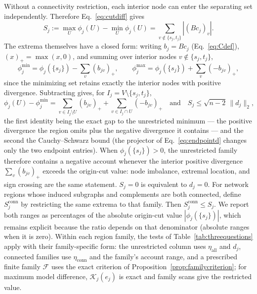 \documentclass[a4paper,fleqn]{cas-sc}
\newcommand{\norm}[1]{\lVert #1 \rVert}
\begin{document}
Without a connectivity restriction, each interior node can enter the
separating set independently. Therefore Eq.~\eqref{eq:cutdiff} gives
\begin{equation}
S_j:=\max_U\phi_j(U)-\min_U\phi_j(U)
=\sum_{v\notin\{s_j,t_j\}}|(Bc_j)_v|.
\label{eq:cutspread}
\end{equation}
The extrema themselves have a closed form: writing $b_j=Bc_j$
(Eq.~\eqref{eq:Cdef}), $(x)_+=\max(x,0)$, and summing over interior nodes
$v\notin\{s_j,t_j\}$,
\begin{equation}
\phi_j^{\min}=\phi_j(\{s_j\})-\sum_v(b_{jv})_+,
\qquad
\phi_j^{\max}=\phi_j(\{s_j\})+\sum_v(-b_{jv})_+,
\label{eq:cutextrema}
\end{equation}
since the minimizing set retains exactly the interior nodes with
positive divergence. Subtracting gives, for $I_j=V\setminus\{s_j,t_j\}$,
\begin{equation}
\phi_j(U)-\phi_j^{\min}
=\sum_{v\in I_j\setminus U}(b_{jv})_+
+\sum_{v\in I_j\cap U}(-b_{jv})_+
\quad\text{and}\quad
S_j\le\sqrt{n-2}\,\norm{d_j}_2,
\label{eq:cutgap}
\end{equation}
the first identity being the exact gap to the unrestricted minimum ---
the positive divergence the region omits plus the negative divergence
it contains --- and the second the Cauchy--Schwarz bound (the
projector of Eq.~\eqref{eq:endpointd} changes only the two endpoint
entries). When
$\phi_j(\{s_j\})>0$, the unrestricted family
therefore contains a negative account whenever the interior positive
divergence $\sum_v(b_{jv})_+$ exceeds the origin-cut value: node
imbalance, extremal location, and sign crossing are the same statement.
$S_j=0$ is equivalent to $d_j=0$.
For network regions whose induced subgraphs and complements are both
connected, define $S_j^{\mathrm{conn}}$ by restricting the same extrema to
that family. Then $S_j^{\mathrm{conn}}\le S_j$. We report both
ranges as percentages of the absolute origin-cut value
$|\phi_j(\{s_j\})|$, which remains explicit because the ratio depends
on that denominator (absolute ranges when it is zero). Within each
region family, the tests of Table~\ref{tab:threequestions} apply with
their family-specific form: the unrestricted column uses
$\eta_{\mathrm{all}}$ and $d_j$, connected families use
$\eta_{\mathrm{conn}}$ and the family's account range, and a
prescribed finite family $\mathcal F$ uses the exact criterion of
Proposition~\ref{prop:familycriterion}; for
maximum model difference, $\mathcal K_j(e_j)$ is exact and family
scans give the restricted value.
\end{document}

